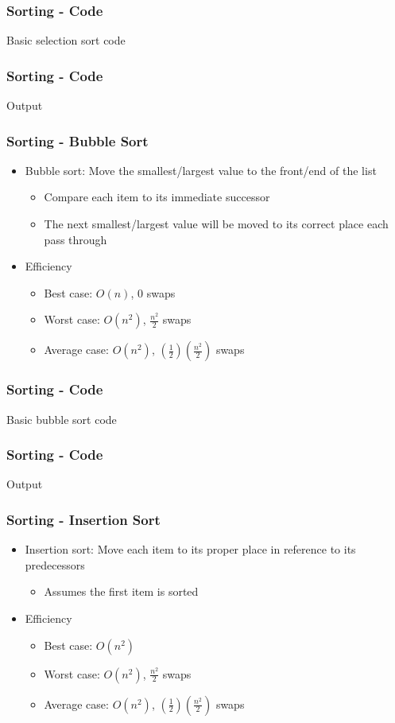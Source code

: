 \documentclass[c, aspectratio=169]{beamer}
\begin{document}
\begin{frame}\frametitle{Sorting - Code}
Basic selection sort code

\end{frame}

\begin{frame}\frametitle{Sorting - Code}
Output

\end{frame}

\begin{frame}\frametitle{Sorting - Bubble Sort}
\begin{itemize}
\item Bubble sort: Move the smallest/largest value to the front/end of the list
	\begin{itemize}
	\item Compare each item to its immediate successor
	\item The next smallest/largest value will be moved to its correct place each pass through
	\end{itemize}
\item Efficiency
	\begin{itemize}
	\item Best case: $O(n)$, $0$ swaps
	\item Worst case: $O(n^2)$, $\frac{n^2}{2}$ swaps
	\item Average case: $O(n^2)$, $(\frac{1}{2})(\frac{n^2}{2})$ swaps
	\end{itemize}
\end{itemize}
\end{frame}

\begin{frame}\frametitle{Sorting - Code}
Basic bubble sort code

\end{frame}

\begin{frame}\frametitle{Sorting - Code}
Output

\end{frame}

\begin{frame}\frametitle{Sorting - Insertion Sort}
\begin{itemize}
\item Insertion sort: Move each item to its proper place in reference to its predecessors
	\begin{itemize}
	\item Assumes the first item is sorted
	\end{itemize}
\item Efficiency
	\begin{itemize}
	\item Best case: $O(n^2)$
	\item Worst case: $O(n^2)$, $\frac{n^2}{2}$ swaps
	\item Average case: $O(n^2)$, $(\frac{1}{2})(\frac{n^2}{2})$ swaps
	\end{itemize}
\end{itemize}
\end{frame}
\end{document}
